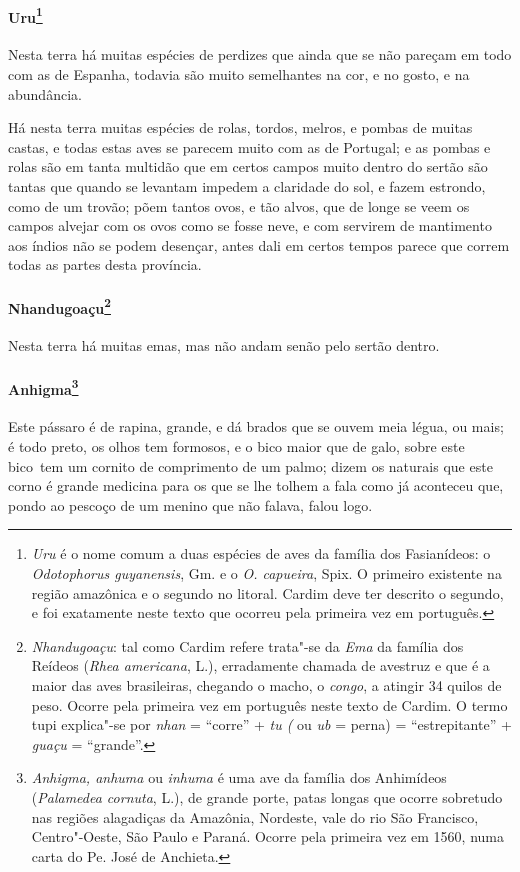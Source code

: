 \paragraph{Uru\footnote{ \textit{Uru} é o nome comum a duas espécies
de aves da família dos Fasianídeos: o \textit{Odotophorus guyanensis}, 
Gm. e o \textit{O. capueira}, Spix. O primeiro existente na região
amazônica e o segundo no litoral. Cardim deve ter descrito o segundo, e
foi exatamente neste texto que ocorreu pela primeira vez em
português.}} Nesta terra há muitas espécies de perdizes que
ainda que se não pareçam em todo com as de Espanha, todavia são muito
semelhantes na cor, e no gosto, e na abundância. 

 Há nesta terra muitas espécies de rolas, tordos, melros, e pombas de
muitas castas, e todas estas aves se parecem muito com as de Portugal;
e as pombas e rolas são em tanta multidão que em certos campos muito
dentro do sertão são tantas que quando se levantam impedem a claridade
do sol, e fazem estrondo, como de um trovão; põem tantos ovos, e tão
alvos, que de longe se veem os campos alvejar com os ovos como se fosse
neve, e com servirem de mantimento aos índios não se podem desençar,
antes dali em certos tempos parece que correm todas as partes desta província. 

\paragraph{Nhandugoaçu\footnote{ \textit{Nhandugoaçu}: tal como Cardim
refere trata"-se da \textit{Ema} da família dos Reídeos (\textit{Rhea
americana}, L.), erradamente chamada de avestruz e que é a maior das aves
brasileiras, chegando o macho, o \textit{congo}, a atingir 34 quilos de
peso. Ocorre pela primeira vez em português neste texto de Cardim. O
termo tupi explica"-se por \textit{nhan} = ``corre'' + \textit{tu (} ou
\textit{ub} = perna) = ``estrepitante'' + \textit{guaçu} = ``grande''.}} 
Nesta terra há muitas emas, mas não andam senão pelo sertão dentro. 

\paragraph{Anhigma\footnote{ \textit{Anhigma, anhuma} ou \textit{inhuma}
é uma ave da família dos Anhimídeos (\textit{Palamedea cornuta}, L.), 
de grande porte, patas longas que ocorre sobretudo nas regiões
alagadiças da Amazônia, Nordeste, vale do rio São Francisco,
Centro"-Oeste, São Paulo e Paraná. Ocorre pela primeira vez em 1560,
numa carta do Pe. José de Anchieta.}} Este pássaro
é de rapina, grande, e dá brados que se ouvem meia légua, ou mais; é
todo preto, os olhos tem formosos, e o bico maior que de galo, sobre
este \mbox{bico tem} um cornito de comprimento de um palmo; dizem os naturais
que este corno é grande medicina para os que se lhe tolhem a fala como
já aconteceu que, pondo ao pescoço de um menino que não falava, falou logo.

